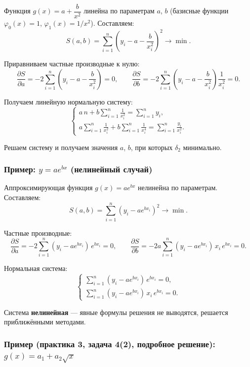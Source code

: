 Функция $g(x) = a + \dfrac{b}{x^2}$ линейна по параметрам $a$, $b$ (базисные функции $\varphi_0(x) = 1$, $\varphi_1(x) = 1/x^2$). Составляем:
\[
    S(a, b) = \sum_{i=1}^{n} \left(y_i - a - \frac{b}{x_i^2}\right)^2 \longrightarrow \min.
\]

Приравниваем частные производные к нулю:
\[
    \frac{\partial S}{\partial a} = -2 \sum_{i=1}^{n} \left(y_i - a - \frac{b}{x_i^2}\right) = 0, \qquad
    \frac{\partial S}{\partial b} = -2 \sum_{i=1}^{n} \left(y_i - a - \frac{b}{x_i^2}\right) \frac{1}{x_i^2} = 0.
\]

Получаем линейную нормальную систему:
\[
    \begin{cases}
        \displaystyle a\, n + b \sum_{i=1}^{n} \frac{1}{x_i^2} = \sum_{i=1}^{n} y_i, \\[8pt]
        \displaystyle a \sum_{i=1}^{n} \frac{1}{x_i^2} + b \sum_{i=1}^{n} \frac{1}{x_i^4} = \sum_{i=1}^{n} \frac{y_i}{x_i^2}.
    \end{cases}
\]

Решаем систему и получаем значения $a$, $b$, при которых $\delta_2$ минимально.


\subsubsection*{Пример: $y = a e^{bx}$ (нелинейный случай)}

Аппроксимирующая функция $g(x) = a e^{bx}$ нелинейна по параметрам. Составляем:
\[
    S(a, b) = \sum_{i=1}^{n} (y_i - a e^{b x_i})^2 \longrightarrow \min.
\]

Частные производные:
\[
    \frac{\partial S}{\partial a} = -2 \sum_{i=1}^{n} (y_i - a e^{b x_i})\, e^{b x_i} = 0, \qquad
    \frac{\partial S}{\partial b} = -2a \sum_{i=1}^{n} (y_i - a e^{b x_i})\, x_i\, e^{b x_i} = 0.
\]

Нормальная система:
\[
    \begin{cases}
        \displaystyle \sum_{i=1}^{n} (y_i - a e^{b x_i})\, e^{b x_i} = 0, \\[8pt]
        \displaystyle \sum_{i=1}^{n} (y_i - a e^{b x_i})\, x_i\, e^{b x_i} = 0.
    \end{cases}
\]

Система \textbf{нелинейная} --- явные формулы решения не выводятся, решается приближёнными методами.


\subsubsection*{Пример (практика 3, задача 4(2), подробное решение): $g(x) = a_1 + a_2\sqrt{x}$}

